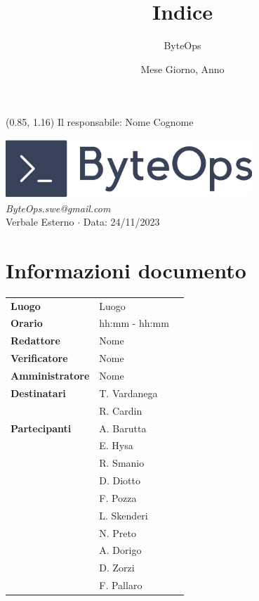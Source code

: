 \documentclass{article}
\title{\textbf{\fontsize{28}{6}\selectfont Indice}}
\author{\fontsize{14}{6}\selectfont ByteOps}
\date{Mese Giorno, Anno}
\begin{document}
\begin{textblock*}{\textwidth}(0.85\textwidth, 1.16\textheight)
    Il responsabile: Nome Cognome
\end{textblock*}

\pagestyle{fancy}
\begin{center}
\includegraphics[width = 0.7\textwidth]{../../../Images/logo.png} \\
\vspace{0.2cm}
\textcolor[RGB]{60, 60, 60}{\textit{ByteOps.swe@gmail.com}} \\
\vspace{1cm}
\fontsize{16}{6}\selectfont Verbale Esterno $\cdot$ Data: 24/11/2023 \\
\vspace{0.5cm}
\end{center}

\section*{Informazioni documento}
\def\arraystretch{1.2}
\begin{tabular}{>{\raggedleft\arraybackslash}p{}|>{\raggedright\arraybackslash}p{}c}
\hline
\addlinespace
\textbf{Luogo} & Luogo \vspace{10pt} \\
\textbf{Orario} & hh:mm - hh:mm \vspace{10pt} \\
\textbf{Redattore} & Nome \vspace{10pt} \\
\textbf{Verificatore} & Nome \vspace{10pt} \\
\textbf{Amministratore} & Nome \vspace{10pt} \\
\textbf{Destinatari} & T. Vardanega \\ & R. Cardin \vspace{10pt} \\
\textbf{Partecipanti} & A. Barutta \\ & E. Hysa \\ & R. Smanio \\ & D. Diotto \\ & F. Pozza \\ & L. Skenderi \\ & N. Preto \\ & A. Dorigo \\ & D. Zorzi \\ & F. Pallaro \vspace{10pt} \\
\end{tabular}
\pagebreak 
\end{document}
